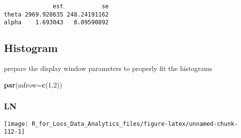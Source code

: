 \documentclass[]{book}
\newenvironment{Shaded}{\begin{snugshade}}{\end{snugshade}}
\newcommand{\KeywordTok}[1]{\textcolor[rgb]{0.13,0.29,0.53}{\textbf{#1}}}
\newcommand{\DataTypeTok}[1]{\textcolor[rgb]{0.13,0.29,0.53}{#1}}
\newcommand{\DecValTok}[1]{\textcolor[rgb]{0.00,0.00,0.81}{#1}}
\newcommand{\FloatTok}[1]{\textcolor[rgb]{0.00,0.00,0.81}{#1}}
\newcommand{\StringTok}[1]{\textcolor[rgb]{0.31,0.60,0.02}{#1}}
\newcommand{\OperatorTok}[1]{\textcolor[rgb]{0.81,0.36,0.00}{\textbf{#1}}}
\newcommand{\NormalTok}[1]{#1}
\theoremstyle{definition}
\theoremstyle{definition}
\theoremstyle{definition}
\theoremstyle{remark}
\begin{document}
\begin{verbatim}
              est           se
theta 2969.928635 248.24191162
alpha    1.693043   0.09590892
\end{verbatim}

\subsection{Histogram}\label{histogram}

prepare the display window parameters to properly fit the histograms

\begin{Shaded}
\begin{Highlighting}[]
\KeywordTok{par}\NormalTok{(}\DataTypeTok{mfrow=}\KeywordTok{c}\NormalTok{(}\DecValTok{1}\NormalTok{,}\DecValTok{2}\NormalTok{))}
\end{Highlighting}
\end{Shaded}

\subsubsection{LN}\label{ln}

\begin{Shaded}
\end{Shaded}

\begin{center}\texttt{[image: R\_for\_Loss\_Data\_Analytics\_files/figure-latex/unnamed-chunk-112-1]} \end{center}
\end{document}
